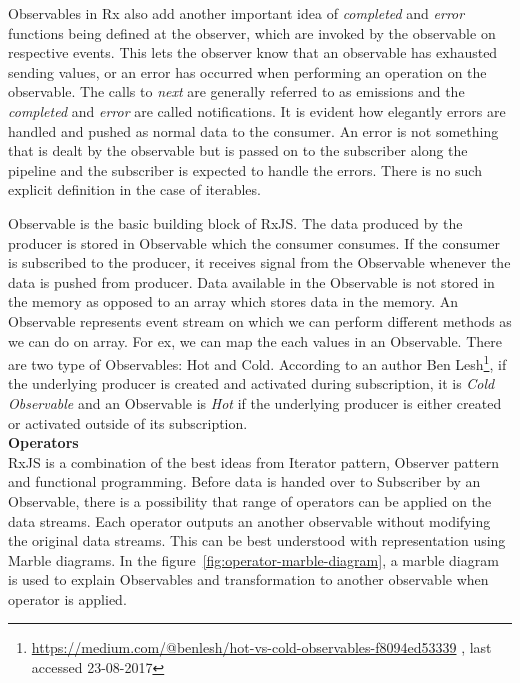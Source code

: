 Observables in Rx also add another important idea of \textit{completed} and \textit{error} functions being defined at the observer, which are invoked by the observable on respective events. This lets the observer know that an observable has exhausted sending values, or an error has occurred when performing an operation on the observable. The calls to \textit{next} are generally referred to as emissions and the \textit{completed} and \textit{error} are called notifications. It is evident how elegantly errors are handled and pushed as normal data to the consumer. An error is not something that is dealt by the observable but is passed on to the subscriber along the pipeline and the subscriber is expected to handle the errors. There is no such explicit definition in the case of iterables.  

Observable is the basic building block of RxJS. The data produced by the producer is stored in Observable which the consumer consumes. If the consumer is subscribed to the producer, it receives signal from the Observable whenever the data is pushed from producer. Data available in the Observable is not stored in the memory as opposed to an array which stores data in the memory. An Observable represents event stream on which we can perform different methods as we can do on array. For ex, we can map the each values in an Observable. There are two type of Observables: Hot and Cold. According to an author Ben Lesh\footnote{\url{https://medium.com/@benlesh/hot-vs-cold-observables-f8094ed53339} , last accessed 23-08-2017}, if the underlying producer is created and activated during subscription, it is \textit{Cold Observable} and an Observable is \textit{Hot} if the underlying producer is either created or activated outside of its subscription.
\\
\textbf{Operators}
\\
RxJS is a combination of the best ideas from Iterator pattern, Observer pattern and functional programming\cite{reactiveX}. Before data is handed over to Subscriber by an Observable, there is a possibility that range of operators can be applied on the data streams. Each operator outputs an another observable without modifying the original data streams. This can be best understood with representation using Marble diagrams. In the figure~\ref{fig:operator-marble-diagram},  a marble diagram is used to explain Observables and transformation to another observable when operator is applied. 

